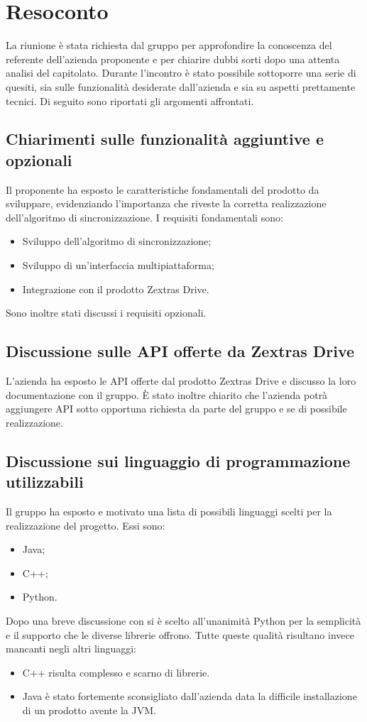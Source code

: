 \newpage


\section{Resoconto}
La riunione è stata richiesta dal gruppo \textit{\Gruppo{}} per approfondire la conoscenza del referente dell'azienda proponente e per chiarire dubbi sorti dopo una attenta analisi del capitolato.
Durante l'incontro è stato possibile sottoporre una serie di quesiti, sia sulle funzionalità desiderate dall'azienda e sia su aspetti prettamente tecnici.
Di seguito sono riportati gli argomenti affrontati.
\subsection{Chiarimenti sulle funzionalità aggiuntive e opzionali}
Il proponente ha esposto le caratteristiche fondamentali del prodotto da sviluppare, evidenziando l'importanza che riveste la corretta realizzazione dell'algoritmo di sincronizzazione.
I requisiti fondamentali sono:
\begin{itemize}
	\item Sviluppo dell'algoritmo di sincronizzazione;
	\item Sviluppo di un'interfaccia multipiattaforma;
	\item Integrazione con il prodotto Zextras Drive.
\end{itemize}
Sono inoltre stati discussi i requisiti opzionali.
\subsection{Discussione sulle API offerte da Zextras Drive}
L'azienda ha esposto le API offerte dal prodotto Zextras Drive e discusso la loro documentazione con il gruppo. È stato inoltre chiarito che l'azienda potrà aggiungere API sotto opportuna richiesta da parte del gruppo e se di possibile realizzazione.
\subsection{Discussione sui linguaggio di programmazione utilizzabili}
Il gruppo ha esposto e motivato una lista di possibili linguaggi scelti per la realizzazione del progetto. Essi sono:
\begin{itemize}
	\item Java;
	\item C++;
	\item Python.
\end{itemize}
Dopo una breve discussione con \Federico{} si è scelto all'unanimità Python per la semplicità e il supporto che le diverse librerie offrono. Tutte queste qualità risultano invece mancanti negli altri linguaggi:
\begin{itemize}
\item C++ risulta complesso e scarno di librerie.
\item Java è stato fortemente sconsigliato dall'azienda data la difficile installazione di un prodotto avente la JVM.
\end{itemize}
